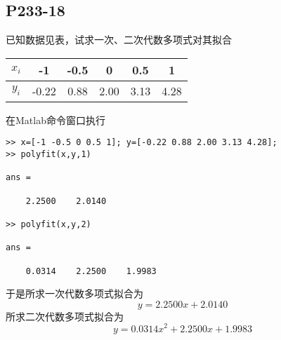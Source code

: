 \subsection{P233-18}
已知数据见表，试求一次、二次代数多项式对其拟合
\begin{center}
\begin{tabular}{c|c c c c c}
$x_i$ & -1    & -0.5 & 0    & 0.5  & 1 \\
\hline
$y_i$ & -0.22 & 0.88 & 2.00 & 3.13 & 4.28
\end{tabular}
\end{center}
\begin{SOLVE}
在Matlab命令窗口执行
\begin{lstlisting}
>> x=[-1 -0.5 0 0.5 1]; y=[-0.22 0.88 2.00 3.13 4.28];
>> polyfit(x,y,1)

ans =

    2.2500    2.0140

>> polyfit(x,y,2)

ans =

    0.0314    2.2500    1.9983
\end{lstlisting}
于是所求一次代数多项式拟合为
\begin{displaymath}
y = 2.2500 x + 2.0140
\end{displaymath}
所求二次代数多项式拟合为
\begin{displaymath}
y = 0.0314 x^2 + 2.2500 x + 1.9983
\end{displaymath}
\end{SOLVE}